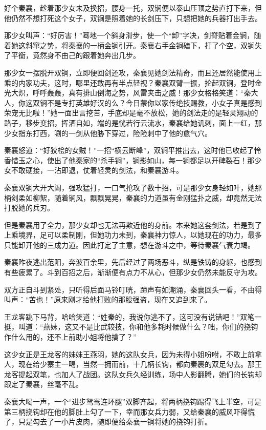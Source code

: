 \documentclass[12pt,oneside]{book}
\begin{document}
好个秦襄，趁着那少女未及换招，腰身一托，双锏便以泰山压顶之势直打下来，但他仍然不想打死这个女子，双锏是照着她的长剑压下，只想把她的兵器打出手去。

那少女叫声：``好厉害！''蓦地一个斜身滑步，使一个``卸''字决，剑脊贴着金锏，随着她这斜窜之势，将秦襄的一柄金锏引开。秦襄右手金锏磕下，打了个空，双锏失了平衡，竟然身不由己的跟着她奔出几步。

那少女一摆脱开双锏，立即便回剑还攻，秦襄见她剑法精奇，而且还居然能使用上乘的内家功夫，这时，哪里还敢再有半点轻视？秦襄双臂一振，抡起双锏，登时金光大炽，呼呼轰轰，真有排山倒海之势，风雷夹击之威！那少女格格笑道：``秦大人，你这双锏不是专打英雄好汉的么？今日蒙你以家传绝技赐教，小女子真是感到荣宠无比啦！''她一面出言挖苦，手底却是毫不放松，她的剑法走的是轻灵翔动的路子，移步变招，挥洒自如，端的是恍若行云流水，秦襄给她讥刺，面上一红，那少女指东打西，唰的一剑从他胁下穿过，险险刺中了他的愈气穴。

秦襄怒道：``好狡桧的女贼！''一招``横云断峰''，双锏平推出去，这时他已收起了怜香惜玉之心，使出了他秦家的``杀手锏''，锏影如山，每一锏都足以开碑裂石！那少女不敢硬接，一沾即退，仗着轻灵的剑法，和秦襄游斗。

秦襄双锏大开大阖，强攻猛打，一口气抢攻了数十招，可是那少女身轻如叶，她那柄剑柔如柳絮，随着锏风，飘飘晃晃，秦襄的力道虽有金刚猛扑之威，却竟然无法打脱她的兵刃。

但是秦襄用了全力，那少女却也无法再欺近他的身前。本来她这套剑法，若是到了上乘境界，足可以柔制刚，但她功力未到，秦襄神力惊人，以她现在的功力，最多只能卸开他的三成力道。因此打定了主意，想在游斗之中，等待秦襄气衰力竭。

秦襄昨夜逃出范阳，奔波百余里，先后经过了两场恶斗，纵是铁铸的身躯，也感到有些疲累了。斗到百招之后，渐渐便有点力不从心，但那少女仍然未能反守为攻。

双方正自斗到紧处，只听得后面马铃叮咣，蹄声有如潮涌，秦襄回头一看，不由得叫声：``苦也！''原来刚才给他打败的那股强盗，现在又追到来了。

王龙客跳下马背，哈哈笑道：``姓秦的，我说你逃不了，这可没有说错吧！''双笔一挺，叫道：``燕妹，这又不是比武较技，你和他多耗时候做什么？咄，你们的挠钩作什么用的，还不上前助小姐将他擒了？''

这少女正是王龙客的妹妹王燕羽，她的这队女兵，因为未得小姐吩咐，不敢上前拿人，现在给少寨主一喝，当然一拥而前，十几柄长钩，都向秦裹的双足勾去。那王龙客提起双笔，也加人了战团。这队女兵久经训练，场中人影翻腾，她们的长钩却跟定了秦襄，丝毫不乱。

秦襄大喝一声，一个``进步鸳鸯连环腿''双脚齐起，将两柄挠钩踢得飞上半空，可是第三柄挠钩却在他的脚肚上勾了一下，幸而那女兵力弱，又给秦襄的威风吓得慌了，只是勾去了一小片皮肉，随即便给秦襄一锏将她的挠钩打折。
\end{document}
